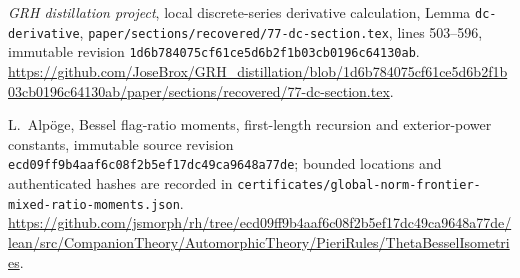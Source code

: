\emph{GRH distillation project}, local
discrete-series derivative calculation, Lemma \texttt{dc-derivative},
\texttt{paper/sections/recovered/77-dc-section.tex}, lines 503--596,
immutable revision
\texttt{1d6b784075cf61ce5d6b2f1b03cb0196c64130ab}.
\url{https://github.com/JoseBrox/GRH_distillation/blob/1d6b784075cf61ce5d6b2f1b03cb0196c64130ab/paper/sections/recovered/77-dc-section.tex}.

L.~Alp\"oge, Bessel flag-ratio moments, first-length recursion and
exterior-power constants, immutable source revision
\texttt{ecd09ff9b4aaf6c08f2b5ef17dc49ca9648a77de};
bounded locations and authenticated hashes are recorded in
\texttt{certificates/global-norm-frontier-mixed-ratio-moments.json}.
\url{https://github.com/jsmorph/rh/tree/ecd09ff9b4aaf6c08f2b5ef17dc49ca9648a77de/lean/src/CompanionTheory/AutomorphicTheory/PieriRules/ThetaBesselIsometries}.
